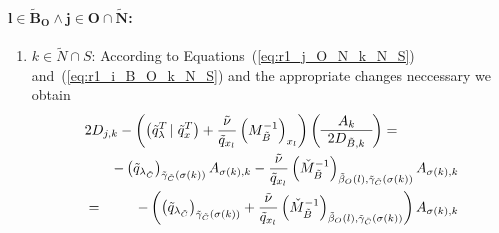 \documentclass[a4paper]{article}
\begin{document}
\paragraph{$\mathbf{l \in \tilde{B}_{O} \wedge j \in O \cap \tilde{N}}$:}
\begin{enumerate}
\item $k \in \tilde{N} \cap S$:
According to Equations~(\ref{eq:r1_j_O_N_k_N_S})
and~(\ref{eq:r1_i_B_O_k_N_S}) and the appropriate changes neccessary we obtain
\begin{eqnarray}
\lefteqn{
2D_{j,k}-\left(
          \left(\tilde{q}_{\lambda}^{T}\left|\right. \tilde{q}_{x}^{T}\right)
	  +\frac{\tilde{\nu}}{\tilde{q}_{x_{l}}}
	  \left(M_{\tilde{B}}^{-1}\right)_{x_{l}}
	\right)
\left(\begin{array}{c}
        A_{k} \\
	\hline
	2D_{\tilde{B},k}
      \end{array}
\right)
=}
\nonumber \\
&&
-\left(\tilde{q}_{\lambda_{\tilde{C}}}\right)_{\tilde{\gamma}_{\tilde{C}}
 (\sigma(k))}A_{\sigma(k),k}
-\frac{\tilde{\nu}}{\tilde{q}_{x_{l}}}
 \left(\check{M}_{\tilde{B}}^{-1}\right)_{\tilde{\beta}_{O}(l),
 \tilde{\gamma}_{\tilde{C}}(\sigma(k))}A_{\sigma(k), k}
\nonumber \\
&=&
-\left(
  \left(\tilde{q}_{\lambda_{\tilde{C}}}\right)_{\tilde{\gamma}_{\tilde{C}}
  (\sigma(k))}
  +\frac{\tilde{\nu}}{\tilde{q}_{x_{l}}}
   \left(\check{M}_{\tilde{B}}^{-1}\right)_{\tilde{\beta}_{O}(l),
   \tilde{\gamma}_{\tilde{C}}(\sigma(k))}
\right)
A_{\sigma(k), k}
\end{eqnarray}


\end{enumerate}
\end{document}
